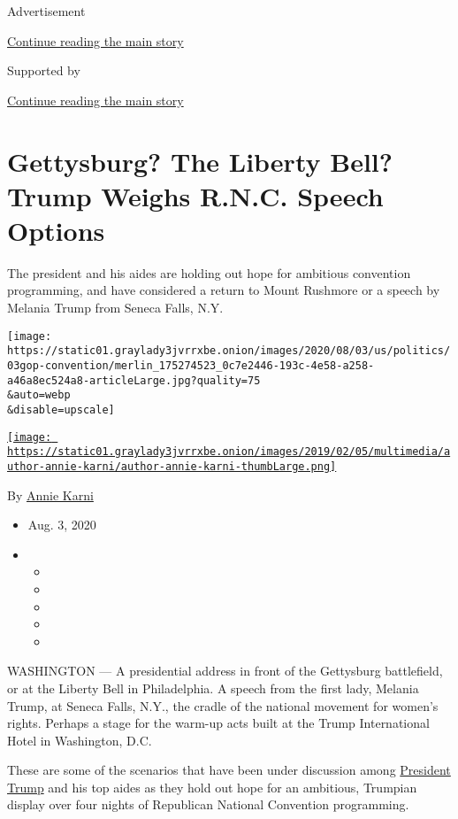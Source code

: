 Advertisement

\protect\hyperlink{after-top}{Continue reading the main story}

Supported by

\protect\hyperlink{after-sponsor}{Continue reading the main story}

\hypertarget{gettysburg-the-liberty-bell-trump-weighs-rnc-speech-options}{%
\section{Gettysburg? The Liberty Bell? Trump Weighs R.N.C. Speech
Options}\label{gettysburg-the-liberty-bell-trump-weighs-rnc-speech-options}}

The president and his aides are holding out hope for ambitious
convention programming, and have considered a return to Mount Rushmore
or a speech by Melania Trump from Seneca Falls, N.Y.

\texttt{[image: https://static01.graylady3jvrrxbe.onion/images/2020/08/03/us/politics/03gop-convention/merlin\_175274523\_0c7e2446-193c-4e58-a258-a46a8ec524a8-articleLarge.jpg?quality=75\\\&auto=webp\\\&disable=upscale]}

\href{https://www.nytimes3xbfgragh.onion/by/annie-karni}{\texttt{[image: https://static01.graylady3jvrrxbe.onion/images/2019/02/05/multimedia/author-annie-karni/author-annie-karni-thumbLarge.png]}}

By \href{https://www.nytimes3xbfgragh.onion/by/annie-karni}{Annie Karni}

\begin{itemize}
\item
  Aug. 3, 2020
\item
  \begin{itemize}
  \item
  \item
  \item
  \item
  \item
  \end{itemize}
\end{itemize}

WASHINGTON --- A presidential address in front of the Gettysburg
battlefield, or at the Liberty Bell in Philadelphia. A speech from the
first lady, Melania Trump, at Seneca Falls, N.Y., the cradle of the
national movement for women's rights. Perhaps a stage for the warm-up
acts built at the Trump International Hotel in Washington, D.C.

These are some of the scenarios that have been under discussion among
\href{https://www.nytimes3xbfgragh.onion/interactive/2020/us/elections/donald-trump.html}{President
Trump} and his top aides as they hold out hope for an ambitious,
Trumpian display over four nights of Republican National Convention
programming.


